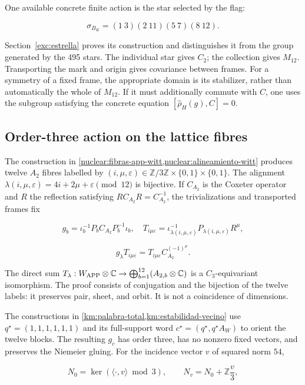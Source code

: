 One available concrete finite action is the star selected by the flag:

\[
\sigma_{B_K}=(1\ 3)(2\ 11)(5\ 7)(8\ 12).
\]

Section~\ref{exc:estrella} proves its construction and distinguishes it from the group generated by the 495 stars. The individual star gives \(C_2\); the collection gives \(M_{12}\). Transporting the mark and origin gives covariance between frames. For a symmetry of a fixed frame, the appropriate domain is its stabilizer, rather than automatically the whole of \(M_{12}\). If it must additionally commute with \(C\), one uses the subgroup satisfying the concrete equation \([\widehat\rho_H(g),C]=0\).

\subsection{Order-three action on the lattice fibres}\label{nuc04:c3}

The construction in \cref{nuclear:fibras-app-witt,nuclear:alineamiento-witt} produces twelve \(A_2\) fibres labelled by \((i,\mu,\varepsilon)\in\mathbb Z/3\mathbb Z\times\{0,1\}\times\{0,1\}\). The alignment \(\lambda(i,\mu,\varepsilon)=4i+2\mu+\varepsilon\pmod{12}\) is bijective. If \(C_{A_2}\) is the Coxeter operator and \(R\) the reflection satisfying \(RC_{A_2}R=C_{A_2}^{-1}\), the trivializations and transported frames fix

\[
g_b=\iota_b^{-1}P_bC_{A_2}P_b^{-1}\iota_b,
\quad T_{i\mu\varepsilon}=\iota_{\lambda(i,\mu,\varepsilon)}^{-1}P_{\lambda(i,\mu,\varepsilon)}R^\mu,
\]

\[
g_\lambda T_{i\mu\varepsilon}
=T_{i\mu\varepsilon}C_{A_2}^{(-1)^\mu}.
\]

The direct sum \(T_\lambda:W_{\rm APP}\otimes\mathbb C\to\bigoplus_{b=1}^{12}(A_{2,b}\otimes\mathbb C)\) is a \(C_3\)-equivariant isomorphism. The proof consists of conjugation and the bijection of the twelve labels: it preserves pair, sheet, and orbit. It is not a coincidence of dimensions.

The constructions in \cref{km:palabra-total,km:estabilidad-vecino} use \(q^\star=(1,1,1,1,1,1)\) and its full-support word \(c^\star=(q^\star,q^\star A_W)\) to orient the twelve blocks. The resulting \(g_c\) has order three, has no nonzero fixed vectors, and preserves the Niemeier gluing. For the incidence vector \(v\) of squared norm \(54\),

\[
N_0=\ker(\langle\cdot,v\rangle\bmod3),\qquad
N_v=N_0+\mathbb Z\frac v3,
\]

